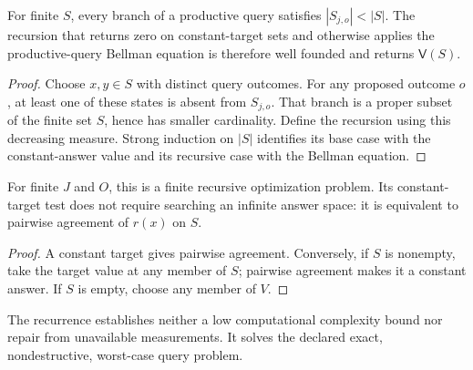 \begin{theorem}\label{thm:repair-termination}
For finite $S$, every branch of a productive query satisfies
$|S_{j,o}|<|S|$. The recursion that returns zero on constant-target sets
and otherwise applies the productive-query Bellman equation is therefore
well founded and returns $\mathsf V(S)$.
\end{theorem}
\begin{proof}
Choose $x,y\in S$ with distinct query outcomes. For any proposed outcome
$o$, at least one of these states is absent from $S_{j,o}$. That branch
is a proper subset of the finite set $S$, hence has smaller cardinality.
Define the recursion using this decreasing measure. Strong induction on
$|S|$ identifies its base case with the constant-answer value and its
recursive case with the Bellman equation.
\end{proof}
For finite $J$ and $O$, this is a finite recursive optimization problem.
Its constant-target test does not require searching an infinite answer
space: it is equivalent to pairwise agreement of $r(x)$ on $S$.
\begin{proof}
A constant target gives pairwise agreement. Conversely, if $S$ is
nonempty, take the target value at any member of $S$; pairwise agreement
makes it a constant answer. If $S$ is empty, choose any member of $V$.
\end{proof}
The recurrence establishes neither a low computational complexity bound
nor repair from unavailable measurements. It solves the declared
exact, nondestructive, worst-case query problem.

